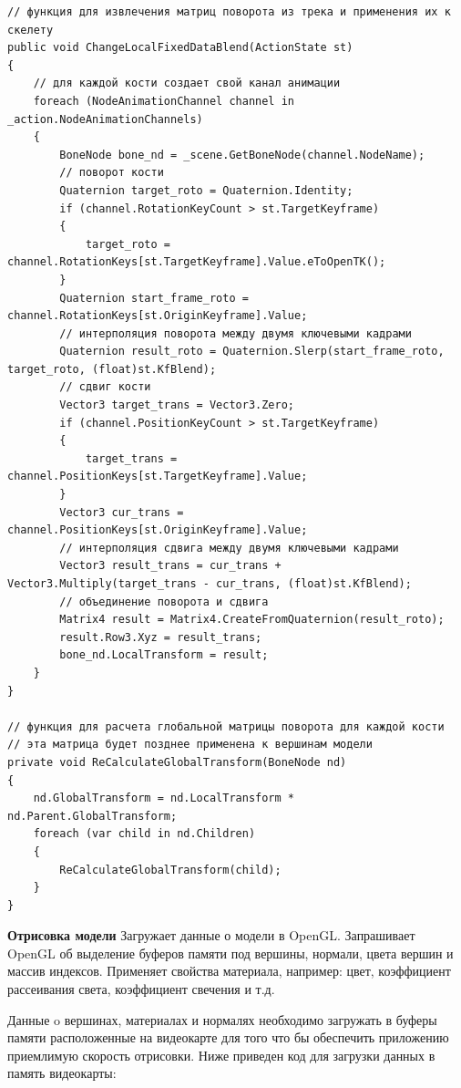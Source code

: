 \begin{verbatim}
// функция для извлечения матриц поворота из трека и применения их к скелету
public void ChangeLocalFixedDataBlend(ActionState st)
{
    // для каждой кости создает свой канал анимации    
    foreach (NodeAnimationChannel channel in _action.NodeAnimationChannels)
    {
        BoneNode bone_nd = _scene.GetBoneNode(channel.NodeName);
        // поворот кости
        Quaternion target_roto = Quaternion.Identity;
        if (channel.RotationKeyCount > st.TargetKeyframe)
        {
            target_roto = channel.RotationKeys[st.TargetKeyframe].Value.eToOpenTK();
        }
        Quaternion start_frame_roto = channel.RotationKeys[st.OriginKeyframe].Value;
        // интерполяция поворота между двумя ключевыми кадрами
        Quaternion result_roto = Quaternion.Slerp(start_frame_roto, target_roto, (float)st.KfBlend);
        // сдвиг кости
        Vector3 target_trans = Vector3.Zero;
        if (channel.PositionKeyCount > st.TargetKeyframe)
        {
            target_trans = channel.PositionKeys[st.TargetKeyframe].Value;
        }
        Vector3 cur_trans = channel.PositionKeys[st.OriginKeyframe].Value;
        // интерполяция сдвига между двумя ключевыми кадрами
        Vector3 result_trans = cur_trans + Vector3.Multiply(target_trans - cur_trans, (float)st.KfBlend);
        // объединение поворота и сдвига
        Matrix4 result = Matrix4.CreateFromQuaternion(result_roto);
        result.Row3.Xyz = result_trans;
        bone_nd.LocalTransform = result;
    }
}

// функция для расчета глобальной матрицы поворота для каждой кости
// эта матрица будет позднее применена к вершинам модели
private void ReCalculateGlobalTransform(BoneNode nd)
{
    nd.GlobalTransform = nd.LocalTransform * nd.Parent.GlobalTransform;
    foreach (var child in nd.Children)
    {
        ReCalculateGlobalTransform(child);
    }
}
\end{verbatim}



\textbf{Отрисовка модели}
Загружает данные о модели в OpenGL.
Запрашивает OpenGL об выделение буферов памяти под вершины, нормали, цвета вершин и массив индексов. Применяет свойства материала, например: цвет, коэффициент рассеивания света, коэффициент свечения и т.д.

Данные o вершинах, материалах и нормалях необходимо загружать в буферы памяти расположенные на видеокарте для того что бы обеспечить приложению приемлимую скорость отрисовки.
Ниже приведен код для загрузки данных в память видеокарты:

